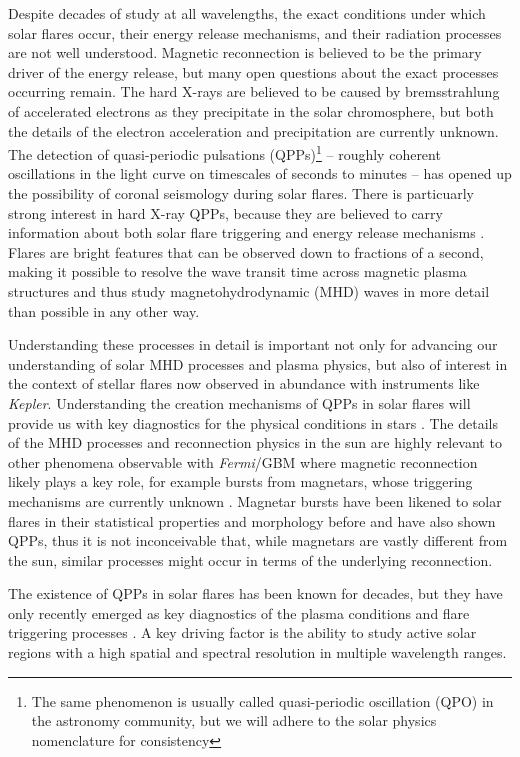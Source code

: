 \documentclass{aastex61}
\newcommand{\fermi}{\mbox{\textit{Fermi}}}
\begin{document}
Despite decades of study at all wavelengths, the exact conditions under which solar flares occur, their energy release mechanisms, and their radiation processes are not well understood.
Magnetic reconnection is believed to be the primary driver of the energy release, but many open questions about the exact processes occurring remain. 
The hard X-rays are believed to be caused by bremsstrahlung of accelerated electrons as they precipitate in the solar chromosphere,  but both the details of the electron acceleration and precipitation are currently unknown.
The detection of quasi-periodic pulsations (QPPs)\footnote{\normalsize{The same phenomenon is usually called quasi-periodic oscillation (QPO) in the astronomy community, but we will adhere to the solar physics nomenclature for consistency}} -- roughly coherent oscillations in the light curve on timescales of seconds to minutes -- has opened up the possibility of coronal seismology during solar flares. 
There is particuarly strong interest in hard X-ray QPPs, because they are believed to carry information about both solar flare triggering and energy release mechanisms \citep[see e.g.][]{nakariakov2009}. 
Flares are bright features that can be observed down to fractions of a second, making it possible to resolve the wave transit time across magnetic plasma structures and thus study magnetohydrodynamic (MHD) waves in more detail than possible in any other way. 

Understanding these processes in detail is important not only for advancing our understanding of solar MHD processes and plasma physics, but also of interest in the context of stellar flares now observed in abundance with instruments like \textit{Kepler}. 
Understanding the creation mechanisms of QPPs in solar flares will provide us with key diagnostics for the physical conditions in stars \citep[e.g.][]{kowalski2010}.
The details of the MHD processes and reconnection physics in the sun are highly relevant to other phenomena observable with \fermi/GBM where magnetic reconnection likely plays a key role, for example bursts from magnetars, whose triggering mechanisms are currently unknown  \citep{turolla2015}. 
Magnetar bursts have been likened to solar flares in their statistical properties and morphology before \citep{prieskorn2012} and have also shown QPPs\citep{huppenkothen2014}, thus it is not inconceivable that, while magnetars are vastly different from the sun, similar processes might occur in terms of the underlying reconnection.

The existence of QPPs in solar flares has been known for decades, but they have only recently emerged as key diagnostics of the plasma conditions and flare triggering processes \citep[e.g.][ and references therein]{nakariakov2009}. 
A key driving factor is the ability to study active solar regions with a high spatial and spectral resolution in multiple wavelength ranges. 
\end{document}
